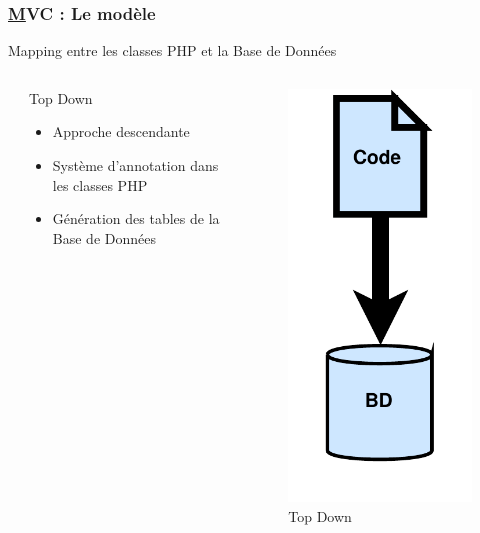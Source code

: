 \begin{frame}
	\frametitle{\underline{M}VC : Le modèle}
	\begin{block}{Mapping entre les classes PHP et la Base de Données}	
		\begin{columns}
			\begin{column}{0.9cm}
			\end{column}
			\begin{column}{6cm}
				\begin{Large} Top Down\end{Large}
				\begin{itemize}
					\item Approche descendante
					\item Système d'annotation dans les classes PHP
					\item Génération des tables de la Base de Données
				\end{itemize}
		\end{column}
		
		\begin{column}{4cm}
			\begin{figure}[!h]
				\begin{center}
					\includegraphics[scale=0.275]{images/topDown}
					\caption{Top Down}
				\end{center}
			\end{figure}
		\end{column}
	
	\end{columns}
	\end{block} 
\end{frame}

